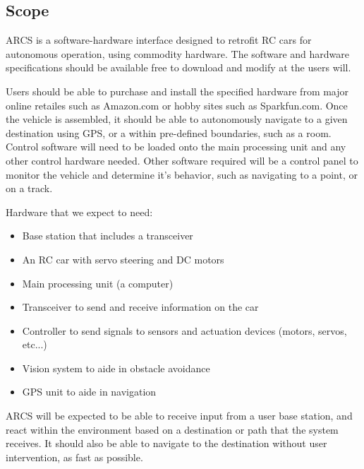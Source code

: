 \documentclass[compsoc,draftclsnofoot,onecolumn,10pt]{IEEEtran}
\begin{document}
\subsection{Scope} %
ARCS is a software-hardware interface designed to retrofit RC cars for autonomous operation, using commodity hardware. 
The software and hardware specifications should be available free to download and modify at the users will. \par
Users should be able to purchase and install the specified hardware from major online retailes such as Amazon.com or hobby sites such as Sparkfun.com.
Once the vehicle is assembled, it should be able to autonomously navigate to a given destination using GPS, or a within pre-defined boundaries, such as a room.  
Control software will need to be loaded onto the main processing unit and any other control hardware needed. 
Other software required will be a control panel to monitor the vehicle and determine it's behavior, such as navigating to a point, or on a track. 

Hardware that we expect to need:
\begin{itemize} 
\item Base station that includes a transceiver
\item An RC car with servo steering and DC motors
\item Main processing unit (a computer)
\item Transceiver to send and receive information on the car
\item Controller to send signals to sensors and actuation devices (motors, servos, etc...) 
\item Vision system to aide in obstacle avoidance
\item GPS unit to aide in navigation
\end{itemize}

ARCS will be expected to be able to receive input from a user base station, and react
within the environment based on a destination or path that the system receives. It should also
be able to navigate to the destination without user intervention, as fast as possible. \par
\end{document}
